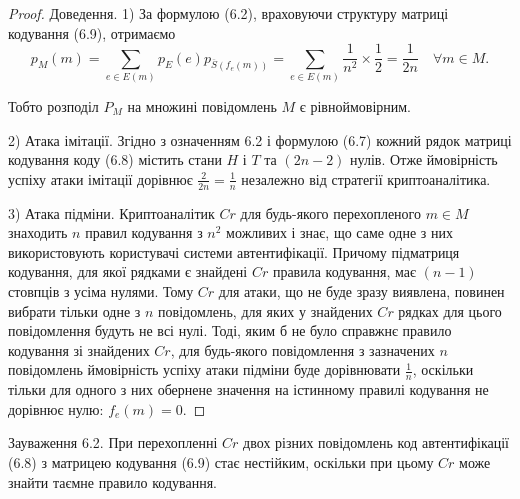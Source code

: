 \begin{proof}
    Доведення. 1) За формулою (6.2), враховуючи структуру матриці кодування (6.9),
    отримаємо
    \begin{equation*}
        p_M(m)
        = \sum_{e \in E(m)} p_E(e) p_{\overline{S}(f_e(m))}
        = \sum_{e \in E(m)} \frac{1}{n^2} \times \frac{1}{2}
        = \frac{1}{2n}
        \quad \forall m \in M.
    \end{equation*}
    
    Тобто розподіл $P_M$ на множині повідомлень $M$ є рівноймовірним.
    
    2) Атака імітації. Згідно з означенням 6.2 і формулою (6.7) кожний рядок матриці
    кодування коду (6.8) містить стани $H$ і $T$ та $(2n - 2)$ нулів. Отже ймовірність
    успіху атаки імітації дорівнює $\frac{2}{2n} = \frac{1}{n}$ незалежно від стратегії криптоаналітика.
    
    3) Атака підміни. Криптоаналітик $Cr$ для будь-якого перехопленого $m \in M$
    знаходить $n$ правил кодування з $n^2$ можливих і знає, що саме одне з них
    використовують користувачі системи автентифікації. Причому підматриця
    кодування, для якої рядками є знайдені $Cr$ правила кодування, має $(n - 1)$ стовпців з
    усіма нулями. Тому $Cr$ для атаки, що не буде зразу виявлена, повинен вибрати
    тільки одне з $n$ повідомлень, для яких у знайдених $Cr$ рядках для цього
    повідомлення будуть не всі нулі. Тоді, яким б не було справжнє правило
    кодування зі знайдених $Cr$, для будь-якого повідомлення з зазначених $n$
    повідомлень ймовірність успіху атаки підміни буде дорівнювати $\frac{1}{n}$, оскільки
    тільки для одного з них обернене значення на істинному правилі кодування не
    дорівнює нулю: $f_e(m) = 0$.
\end{proof}

\begin{remark}
    Зауваження 6.2. При перехопленні $Cr$ двох різних повідомлень код
    автентифікації (6.8) з матрицею кодування (6.9) стає нестійким, оскільки при
    цьому $Cr$ може знайти таємне правило кодування.
\end{remark}

